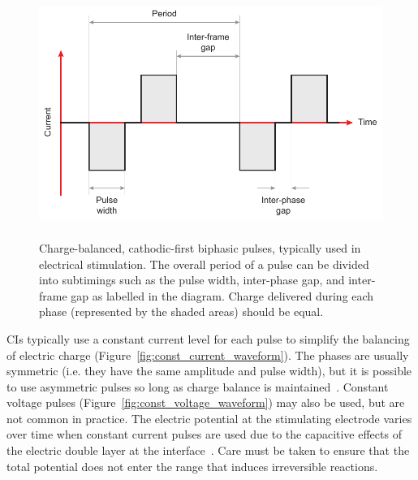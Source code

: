 \begin{figure}
	\centering
	\includegraphics[height=8cm]{Background/biphasic_pulse}
	\caption[Charge-balanced, cathodic-first biphasic pulses]{Charge-balanced,
	cathodic-first biphasic pulses, typically used in electrical stimulation. The
	overall period of a pulse can be divided into subtimings such as the pulse
	width, inter-phase gap, and inter-frame gap as labelled in the diagram. Charge
	delivered during each phase (represented by the shaded areas) should be equal.}
	\label{fig:biphasic_pulse}
\end{figure}

CIs typically use a constant current level for each pulse to simplify the
balancing of electric charge (Figure~\ref{fig:const_current_waveform}). The
phases are usually symmetric (i.e. they have the same amplitude and pulse
width), but it is possible to use asymmetric pulses so long as charge balance is
maintained~\cite{cogan2008}. Constant voltage pulses
(Figure~\ref{fig:const_voltage_waveform}) may also be used, but are not common
in practice. The electric potential at the stimulating electrode varies over
time when constant current pulses are used due to the capacitive effects of the
electric double layer at the
interface~\cite{geddes1972,cobbold1974,grimnes2000}. Care must be taken to
ensure that the total potential does not enter the range that induces
irreversible reactions.

